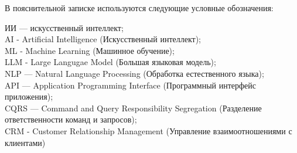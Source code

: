 \label{sec:reduction}

В пояснительной записке используются следующие условные обозначения:

ИИ — искусственный интеллект;\\
AI - Artificial Intelligence (Искусственный интеллект);\\
ML - Machine Learning (Машинное обучение);\\
LLM - Large Langugae Model (Большая языковая модель);\\
NLP — Natural Language Processing (Обработка естественного языка);\\
API — Application Programming Interface (Программный интерфейс приложения);\\
CQRS — Command and Query Responsibility Segregation (Разделение ответственности команд и запросов);\\
CRM - Customer Relationship Management (Управление взаимоотношениями с клиентами)

